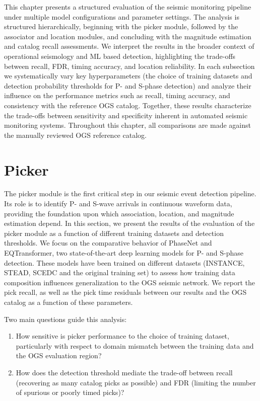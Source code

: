 \label{chap:Results}
This chapter presents a structured evaluation of the seismic monitoring
pipeline under multiple model configurations and parameter settings. The
analysis is structured hierarchically, beginning with the picker module,
followed by the associator and location modules, and concluding with the
magnitude estimation and catalog recall assessments. We interpret the results
in the broader context of operational seismology and ML based detection,
highlighting the trade-offs between recall, \ac{FDR}, timing accuracy, and
location reliability. In each subsection we systematically vary key
hyperparameters (the choice of training datasets and detection probability
thresholds for P- and S-phase detection) and analyze their influence on the
performance metrics such as recall, timing accuracy, and consistency with the
reference OGS catalog. Together, these results characterize the trade-offs
between sensitivity and specificity inherent in automated seismic monitoring
systems. Throughout this chapter, all comparisons are made against the manually
reviewed OGS reference catalog.

\section{Picker}
The picker module is the first critical step in our seismic event detection
pipeline. Its role is to identify P- and S-wave arrivals in continuous waveform
data, providing the foundation upon which association, location, and magnitude
estimation depend. In this section, we present the results of the evaluation of
the picker module as a function of different training datasets and detection
thresholds. We focus on the comparative behavior of PhaseNet and EQTransformer,
two state-of-the-art deep learning models for P- and S-phase detection. These
models have been trained on different datasets (INSTANCE, STEAD, SCEDC and the
original training set) to assess how training data composition influences
generalization to the OGS seismic network. We report the pick recall, as well
as the pick time residuals between our results and the OGS catalog as a
function of these parameters.

Two main questions guide this analysis:
\begin{enumerate}
  \item How sensitive is picker performance to the choice of training dataset,
    particularly with respect to domain mismatch between the training data and
    the OGS evaluation region?
  \item How does the detection threshold mediate the trade-off between
    recall (recovering as many catalog picks as possible) and \ac{FDR}
    (limiting the number of spurious or poorly timed picks)?
\end{enumerate}

